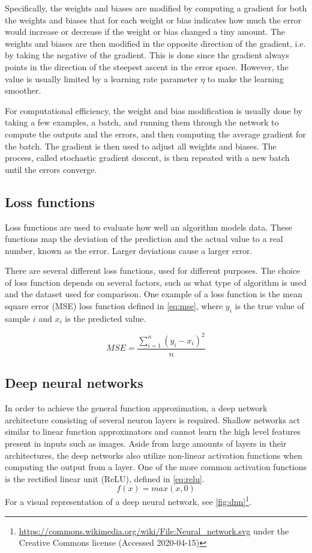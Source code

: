 \documentclass{kththesis}
\begin{document}
Specifically, the weights and biases are modified by computing a gradient for both the weights and biases that for each weight or bias indicates how much the error would increase or decrease if the weight or bias changed a tiny amount. The weights and biases are then modified in the opposite direction of the gradient, i.e. by taking the negative of the gradient. This is done since the gradient always points in the direction of the steepest ascent in the error space. However, the value is usually limited by a learning rate parameter $\eta$ to make the learning smoother. \parencite{lecun2015deep}

For computational efficiency, the weight and bias modification is usually done by taking a few examples, a batch, and running them through the network to compute the outputs and the errors, and then computing the average gradient for the batch. The gradient is then used to adjust all weights and biases. The process, called stochastic gradient descent, is then repeated with a new batch until the errors converge. \parencite{bottou2010large}

\subsection{Loss functions}
\label{sec:loss}
Loss functions are used to evaluate how well an algorithm models data. These functions map the deviation of the prediction and the actual value to a real number, known as the error. Larger deviations cause a larger error.

There are several different loss functions, used for different purposes. The choice of loss function depends on several factors, such as what type of algorithm is used and the dataset used for comparison. One example of a loss function is the mean square error (MSE) loss function defined in \autoref{eq:mse}, where $y_i$ is the true value of sample $i$ and $x_i$ is the predicted value. \parencite{CommonLo62:online}

\begin{equation}
\label{eq:mse}
MSE = \frac{\sum_{i=1}^n (y_i - x_i)^2}{n}
\end{equation}

\subsection{Deep neural networks}
In order to achieve the general function approximation, a deep network architecture consisting of several neuron layers is required. Shallow networks act similar to linear function approximators and cannot learn the high level features present in inputs such as images. Aside from large amounts of layers in their architectures, the deep networks also utilize non-linear activation functions when computing the output from a layer. One of the more common activation functions is the rectified linear unit (ReLU), defined in \autoref{eq:relu}.
\begin{equation}
\label{eq:relu}
f(x) = max(x, 0)
\end{equation}
For a visual representation of a deep neural network, see \autoref{fig:dnn}\footnote{\url{https://commons.wikimedia.org/wiki/File:Neural_network.svg} under the Creative Commons license (Accessed 2020-04-15)}.
\end{document}
